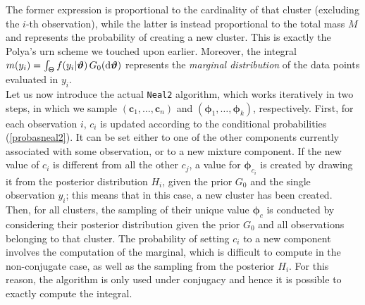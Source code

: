 The former expression is proportional to the cardinality of that cluster (excluding the $i$-th observation), while the latter is instead proportional to the total mass $M$ and represents the probability of creating a new cluster.
This is exactly the Polya's urn scheme we touched upon earlier.
Moreover, the integral $m(y_i) = \int_{\Theta} f(y_{i}|\boldsymbol{\vartheta}) \, G_0(\mathrm d\boldsymbol{\vartheta})$ represents the \emph{marginal distribution} of the data points evaluated in $y_i$. \\
Let us now introduce the actual \verb|Neal2| algorithm, which works iteratively in two steps, in which we sample $(\boldsymbol{c}_1,\dots,\boldsymbol{c}_n)$ and $(\boldsymbol{\phi}_1,\dots,\boldsymbol{\phi}_k)$, respectively.
First, for each observation $i$, $c_i$ is updated according to the conditional probabilities (\ref{probasneal2}).
It can be set either to one of the other components currently associated with some observation, or to a new mixture component.
If the new value of $c_i$ is different from all the other $c_j$, a value for $\boldsymbol\phi_{c_i}$ is created by drawing it from the posterior distribution $H_i$, given the prior $G_0$ and the single observation $y_i$; this means that in this case, a new cluster has been created. \\
Then, for all clusters, the sampling of their unique value $\boldsymbol\phi_c$ is conducted by considering their posterior distribution given the prior $G_0$ and all observations belonging to that cluster.
The probability of setting $c_i$ to a new component involves the computation of the marginal, which is difficult to compute in the non-conjugate case, as well as the sampling from the posterior $H_i$.
For this reason, the algorithm is only used under conjugacy and hence it is possible to exactly compute the integral.

